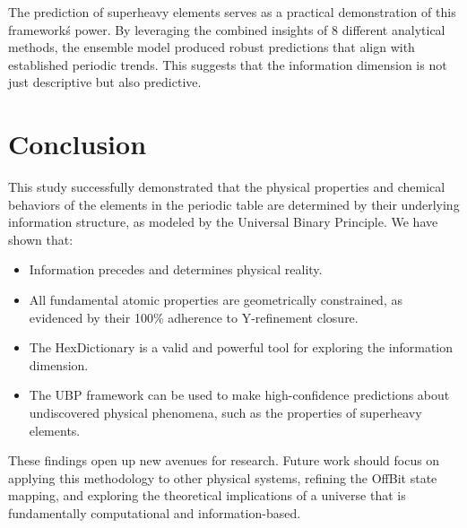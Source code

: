 \documentclass[12pt, a4paper]{article}
\begin{document}
The prediction of superheavy elements serves as a practical demonstration of this framework\'s power. By leveraging the combined insights of 8 different analytical methods, the ensemble model produced robust predictions that align with established periodic trends. This suggests that the information dimension is not just descriptive but also predictive.


\section{Conclusion}

This study successfully demonstrated that the physical properties and chemical behaviors of the elements in the periodic table are determined by their underlying information structure, as modeled by the Universal Binary Principle. We have shown that:

\begin{itemize}
    \item Information precedes and determines physical reality.
    \item All fundamental atomic properties are geometrically constrained, as evidenced by their 100\% adherence to Y-refinement closure.
    \item The HexDictionary is a valid and powerful tool for exploring the information dimension.
    \item The UBP framework can be used to make high-confidence predictions about undiscovered physical phenomena, such as the properties of superheavy elements.
\end{itemize}

These findings open up new avenues for research. Future work should focus on applying this methodology to other physical systems, refining the OffBit state mapping, and exploring the theoretical implications of a universe that is fundamentally computational and information-based.

\newpage
\end{document}

